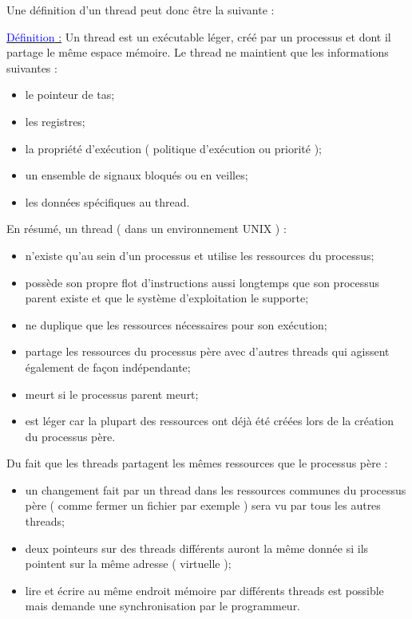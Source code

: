 \documentclass[fleqn,11pt]{article}
\begin{document}
Une définition d'un thread peut donc être la suivante  : 

\underline{\textcolor{blue}{Définition} :} Un thread est un exécutable léger,
créé par un processus et dont il partage le même espace mémoire. Le thread ne maintient
que les informations suivantes :
\begin{itemize}
 \item le pointeur de tas;
 \item les registres;
 \item la propriété d'exécution ( politique d'exécution ou priorité );
 \item un ensemble de signaux bloqués ou en veilles;
 \item les données spécifiques au thread.
\end{itemize}

En résumé, un thread ( dans un environnement UNIX ) :
\begin{itemize}
 \item n'existe qu'au sein d'un processus et utilise les ressources du processus;
 \item possède son propre flot d'instructions aussi longtemps que son processus parent
       existe et que le système d'exploitation le supporte;
 \item ne duplique que les ressources nécessaires pour son exécution;
 \item partage les ressources du processus père avec d'autres threads qui agissent également de
 façon indépendante;
 \item meurt si le processus parent meurt;
 \item est léger car la plupart des ressources ont déjà été créées lors de la création du processus père.
\end{itemize}

Du fait que les threads partagent les mêmes ressources que le processus père :
\begin{itemize}
 \item un changement fait par un thread dans les ressources communes du processus père ( comme fermer un fichier par exemple ) sera vu par tous les autres threads;
 \item deux pointeurs sur des threads différents auront la même donnée si ils pointent sur la même adresse ( virtuelle );
 \item lire et écrire au même endroit mémoire par différents threads est possible mais demande une synchronisation par le programmeur.
\end{itemize}
\end{document}
